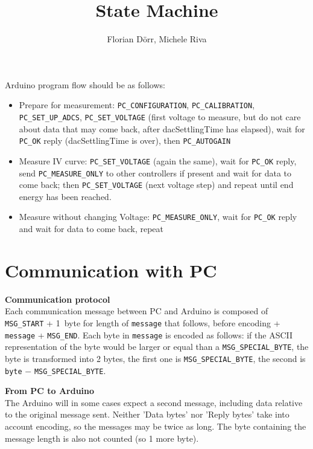 \documentclass[11pt,a4paper,english]{article}
\author{Florian D\"orr, Michele Riva}
\title{State Machine}
\begin{document}
\titlepage

Arduino program flow should be as follows:
\begin{itemize}
\item Prepare for measurement: \texttt{PC\_CONFIGURATION}, \texttt{PC\_CALIBRATION}, \texttt{PC\_SET\_UP\_ADCS}, \texttt{PC\_SET\_VOLTAGE} (first voltage to measure, but do not care about data that may come back, after dacSettlingTime has elapsed), wait for \texttt{PC\_OK} reply (dacSettlingTime is over), then \texttt{PC\_AUTOGAIN}
\item Measure IV curve: \texttt{PC\_SET\_VOLTAGE} (again the same), wait for \texttt{PC\_OK} reply, send \texttt{PC\_MEASURE\_ONLY} to other controllers if present and wait for data to come back; then \texttt{PC\_SET\_VOLTAGE} (next voltage step) and repeat until end energy has been reached.
\item Measure without changing Voltage: \texttt{PC\_MEASURE\_ONLY}, wait for \texttt{PC\_OK} reply and wait for data to come back, repeat
\end{itemize}

\section{Communication with PC}
\textbf{Communication protocol}\\Each communication message between PC and Arduino is composed of \texttt{MSG\_START} + 1~byte for length of \texttt{message} that follows, before encoding + \texttt{message} + \texttt{MSG\_END}. Each byte in \texttt{message} is encoded as follows: if the ASCII representation of the byte would be larger or equal than a \texttt{MSG\_SPECIAL\_BYTE}, the byte is transformed into 2 bytes, the first one is \texttt{MSG\_SPECIAL\_BYTE}, the second is \texttt{byte} $-$ \texttt{MSG\_SPECIAL\_BYTE}.

\vspace*{\baselineskip}
\noindent\textbf{From PC to Arduino}\\The Arduino will in some cases expect a second message, including data relative to the original message sent. Neither 'Data bytes' nor 'Reply bytes' take into account encoding, so the messages may be twice as long. The byte containing the message length is also not counted (so 1 more byte).
\end{document}
